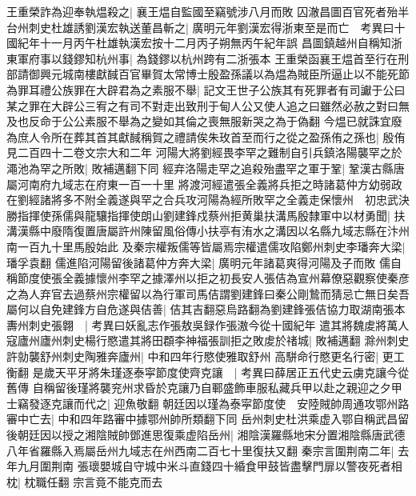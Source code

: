 王重榮詐為迎奉執煴殺之|{
	襄王煴自監國至竊號涉八月而敗}
囚澈昌圖百官死者殆半　台州刺史杜雄誘劉漢宏執送董昌斬之|{
	廣明元年劉漢宏得浙東至是而亡　考異曰十國紀年十一月丙午杜雄執漢宏按十二月丙子朔無丙午紀年誤}
昌圖鎮越州自稱知浙東軍府事以錢鏐知杭州事|{
	為錢鏐以杭州跨有二浙張本}
王重榮函襄王煴首至行在刑部請御興元城南樓獻馘百官畢賀太常博士殷盈孫議以為煴為賊臣所逼止以不能死節為罪耳禮公族罪在大辟君為之素服不舉|{
	記文王世子公族其有死罪者有司讞于公曰某之罪在大辟公三宥之有司不對走出致刑于甸人公又使人追之曰雖然必赦之對曰無及也反命于公公素服不舉為之變如其倫之喪無服新哭之為于偽翻}
今煴已就誅宜廢為庶人令所在葬其首其獻馘稱賀之禮請俟朱玫首至而行之從之盈孫侑之孫也|{
	殷侑見二百四十二卷文宗大和二年}
河陽大將劉經畏李罕之難制自引兵鎮洛陽襲罕之於澠池為罕之所敗|{
	敗補邁翻下同}
經弃洛陽走罕之追殺殆盡罕之軍于鞏|{
	鞏漢古縣唐屬河南府九域志在府東一百一十里}
將渡河經遣張全義將兵拒之時諸葛仲方幼弱政在劉經諸將多不附全義遂與罕之合兵攻河陽為經所敗罕之全義走保懷州　初忠武決勝指揮使孫儒與龍驤指揮使朗山劉建鋒戍蔡州拒黄巢扶溝馬殷隸軍中以材勇聞|{
	扶溝漢縣中廢隋復置唐屬許州陳留風俗傳小扶亭有洧水之溝因以名縣九域志縣在汴州南一百九十里馬殷始此}
及秦宗權叛儒等皆屬焉宗權遣儒攻陷鄭州刺史李璠奔大梁|{
	璠孚袁翻}
儒進陷河陽留後諸葛仲方奔大梁|{
	廣明元年諸葛爽得河陽及子而敗}
儒自稱節度使張全義據懷州李罕之據澤州以拒之初長安人張佶為宣州幕僚惡觀察使秦彦之為人弃官去過蔡州宗權留以為行軍司馬佶謂劉建鋒曰秦公剛鷙而猜忌亡無日矣吾屬何以自免建鋒方自危遂與佶善|{
	佶其吉翻惡烏路翻為劉建鋒張佶協力取湖南張本}
夀州刺史張翺　|{
	考異曰妖亂志作張敖吳録作張滶今從十國紀年}
遣其將魏䖍將萬人寇廬州廬州刺史楊行愍遣其將田頵李神福張訓拒之敗䖍於禇城|{
	敗補邁翻}
滁州刺史許勍襲舒州刺史陶雅奔廬州|{
	中和四年行愍使雅取舒州}
高駢命行愍更名行密|{
	更工衡翻}
是歲天平牙將朱瑾逐泰寜節度使齊克讓　|{
	考異曰薛居正五代史云虜克讓今從舊傳}
自稱留後瑾將襲兖州求昏於克讓乃自鄆盛飾車服私藏兵甲以赴之親迎之夕甲士竊發逐克讓而代之|{
	迎魚敬翻}
朝廷因以瑾為泰寜節度使　安陸賊帥周通攻鄂州路審中亡去|{
	中和四年路審中據鄂州帥所類翻下同}
岳州刺史杜洪乘虚入鄂自稱武昌留後朝廷因以授之湘陰賊帥鄧進思復乘虚陷岳州|{
	湘陰漢羅縣地宋分置湘陰縣唐武德八年省羅縣入焉屬岳州九域志在州西南二百七十里復扶又翻}
秦宗言圍荆南二年|{
	去年九月圍荆南}
張瓌嬰城自守城中米斗直錢四十緍食甲鼓皆盡擊門扉以警夜死者相枕|{
	枕職任翻}
宗言竟不能克而去

